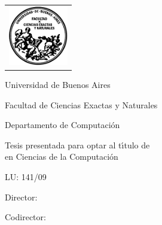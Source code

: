 \newcommand{\HRule}{\rule{\linewidth}{0.2mm}}
%
\thispagestyle{empty}

\begin{center}\leavevmode

\vspace{-2cm}

\begin{tabular}{l}
\includegraphics[width=2.6cm]{logofcen.pdf}
\end{tabular}


{\large \sc Universidad de Buenos Aires

Facultad de Ciencias Exactas y Naturales

Departamento de Computaci\'on}

\vspace{6.0cm}


{\huge\bf \tituloTesis}

\vspace{2cm}

{\large Tesis presentada para optar al t\'{\i}tulo de\\
\titulo en Ciencias de la Computaci\'on}

\vspace{2cm}

{\Large \autor}

{LU: 141/09}

\end{center}

\vfill

{\large

{Director: \director}

\vspace{.2cm}

{Codirector: \codirector}

\vspace{.2cm}

\lugar
}

\newpage\thispagestyle{empty}
